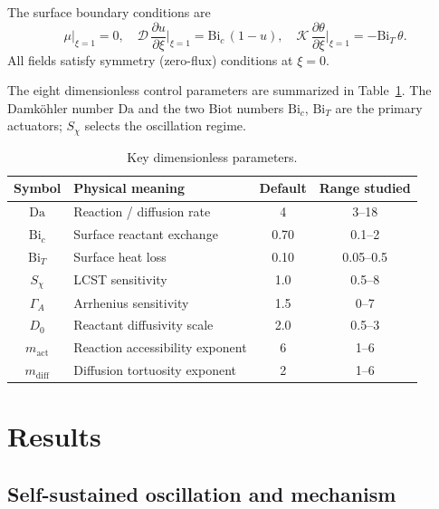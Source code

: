 \documentclass[aps,pre,reprint,superscriptaddress,longbibliography,floatfix]{revtex4-2}
\newcommand{\Ds}{\mathcal{D}}
\newcommand{\Ks}{\mathcal{K}}
\newcommand{\Da}{\mathrm{Da}}
\newcommand{\Bi}{\mathrm{Bi}}
\begin{document}
The surface boundary conditions are
\begin{equation}
  \mu\big|_{\xi=1} = 0,\quad
  \Ds\,\frac{\partial u}{\partial\xi}\Big|_{\xi=1} = \Bi_c\,(1-u),\quad
  \Ks\,\frac{\partial\theta}{\partial\xi}\Big|_{\xi=1} = -\Bi_T\,\theta.
  \label{eq:bc}
\end{equation}
All fields satisfy symmetry (zero-flux) conditions at $\xi=0$.

The eight dimensionless control parameters are summarized in
Table~\ref{tab:params}. The Damköhler number $\Da$ and the two Biot numbers
$\Bi_c$, $\Bi_T$ are the primary actuators; $S_\chi$ selects the oscillation
regime.

\begin{table}[h]
\centering
\caption{Key dimensionless parameters.}
\label{tab:params}
\begin{ruledtabular}
\begin{tabular}{clcc}
Symbol & Physical meaning & Default & Range studied\\
\hline
$\Da$ & Reaction / diffusion rate & 4 & 3--18\\
$\Bi_c$ & Surface reactant exchange & 0.70 & 0.1--2\\
$\Bi_T$ & Surface heat loss & 0.10 & 0.05--0.5\\
$S_\chi$ & LCST sensitivity & 1.0 & 0.5--8\\
$\Gamma_A$ & Arrhenius sensitivity & 1.5 & 0--7\\
$D_0$ & Reactant diffusivity scale & 2.0 & 0.5--3\\
$m_\mathrm{act}$ & Reaction accessibility exponent & 6 & 1--6\\
$m_\mathrm{diff}$ & Diffusion tortuosity exponent & 2 & 1--6\\
\end{tabular}
\end{ruledtabular}
\end{table}

\section{Results}
\label{sec:results}

\subsection{Self-sustained oscillation and mechanism}
\label{sec:osc_mech}
\end{document}
